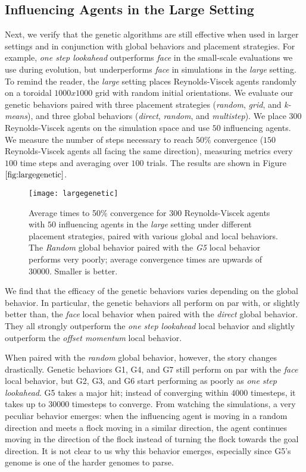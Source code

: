 \subsection{Influencing Agents in the Large Setting}
Next, we verify that the genetic algorithms are still effective when used in
larger settings and in conjunction with global behaviors and placement
strategies.
For example, \textit{one step lookahead} outperforms \textit{face} in the
small-scale evaluations we use during evolution, but underperforms \textit{face}
in simulations in the \textit{large} setting.
To remind the reader, the \textit{large} setting places Reynolds-Viscek agents
randomly on a toroidal $1000x1000$ grid with random initial orientations.
We evaluate our genetic behaviors paired with three placement strategies
(\textit{random}, \textit{grid}, and \textit{k-means}), and three global
behaviors (\textit{direct}, \textit{random}, and \textit{multistep}).
We place $300$ Reynolds-Viscek agents on the simulation space and use $50$
influencing agents.
We measure the number of steps necessary to reach $50\%$ convergence ($150$
Reynolds-Viscek agents all facing the same direction), measuring metrics every
$100$ time steps and averaging over $100$ trials.
The results are shown in Figure $\ref{fig:largegenetic}$.

\begin{figure}
    \centering
    \texttt{[image: largegenetic]}
    \caption{Average times to 50\% convergence for $300$ Reynolds-Viscek agents
    with $50$ influencing agents in the \textit{large} setting under different
    placement strategies, paired with various global and local behaviors.
    The \textit{Random} global behavior paired with the \textit{G5} local behavior
    performs very poorly; average convergence times are upwards of $30000$.
    Smaller is better.}
    \label{fig:largegenetic}
\end{figure}
We find that the efficacy of the genetic behaviors varies depending
on the global behavior.
In particular, the genetic behaviors all perform on par with, or slightly
better than, the \textit{face} local behavior when paired with the \textit{direct}
global behavior.
They all strongly outperform the \textit{one step lookahead} local behavior and
slightly outperform the \textit{offset momentum} local behavior.

When paired with the \textit{random} global behavior, however, the story changes
drastically.
Genetic behaviors G1, G4, and G7 still perform on par with the \textit{face} local
behavior, but G2, G3, and G6 start performing as poorly as \textit{one step
lookahead}.
G5 takes a major hit; instead of converging within $4000$ timesteps, it takes up to
$30000$ timesteps to converge.
From watching the simulations, a very peculiar behavior emerges: when the
influencing agent is moving in a random direction and meets a flock moving in a
similar direction, the agent continues moving in the direction of the flock
instead of turning the flock towards the goal direction.
It is not clear to us why this behavior emerges, especially since G5's genome
is one of the harder genomes to parse.

